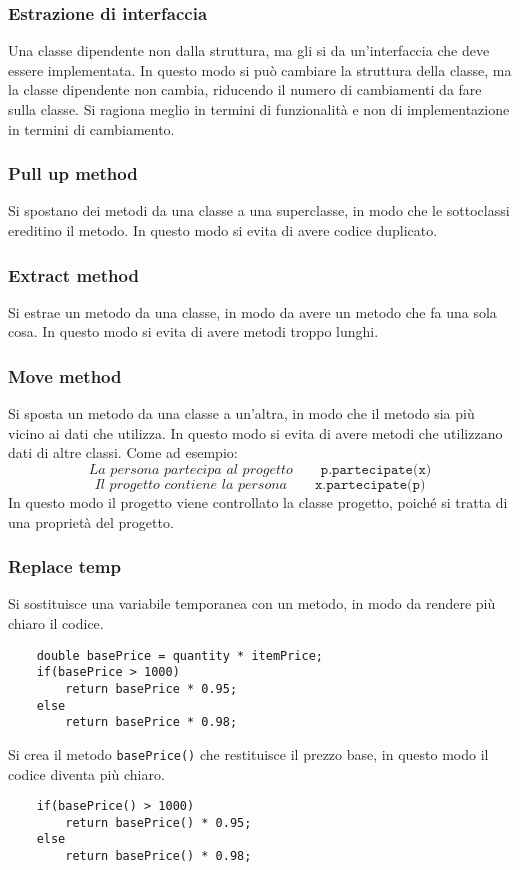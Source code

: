 \subsubsection{Estrazione di interfaccia}
Una classe dipendente non dalla struttura, ma gli si da un'interfaccia
che deve essere implementata. In questo modo si può cambiare la struttura
della classe, ma la classe dipendente non cambia, riducendo il numero di 
cambiamenti da fare sulla classe. Si ragiona meglio in termini di funzionalità 
e non di implementazione in termini di cambiamento.
\subsubsection{Pull up method}
Si spostano dei metodi da una classe a una superclasse, in modo che
le sottoclassi ereditino il metodo. In questo modo si evita di avere
codice duplicato. 
\subsubsection{Extract method}
Si estrae un metodo da una classe, in modo da avere un metodo che
fa una sola cosa. In questo modo si evita di avere metodi troppo lunghi.
\subsubsection{Move method}
Si sposta un metodo da una classe a un'altra, in modo che il metodo
sia più vicino ai dati che utilizza. In questo modo si evita di avere
metodi che utilizzano dati di altre classi.
Come ad esempio:
\[
    \textit{La persona partecipa al progetto}\qquad \texttt{p.partecipate(x)}
\]
\[
    \textit{Il progetto contiene la persona} \qquad \texttt{x.partecipate(p)}
\]
In questo modo il progetto viene controllato la classe progetto,
poiché si tratta di una proprietà del progetto.
\subsubsection{Replace temp}
Si sostituisce una variabile temporanea con un metodo, in modo da
rendere più chiaro il codice.
\begin{lstlisting}
    double basePrice = quantity * itemPrice;
    if(basePrice > 1000)
        return basePrice * 0.95;
    else
        return basePrice * 0.98;
\end{lstlisting}

Si crea il metodo \texttt{basePrice()} che restituisce il
prezzo base, in questo modo il codice diventa più chiaro.
\begin{lstlisting}
    if(basePrice() > 1000)
        return basePrice() * 0.95;
    else
        return basePrice() * 0.98;
\end{lstlisting}
